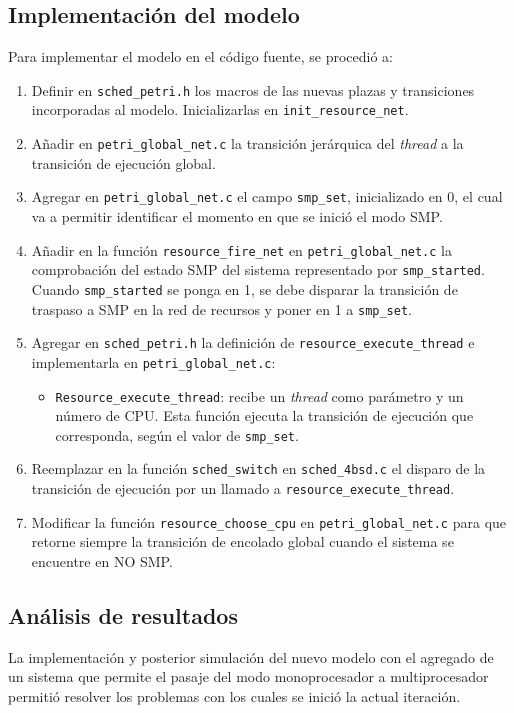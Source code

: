 \documentclass[a4paper]{book}
\begin{document}
\subsection{Implementaci\'on del modelo}
Para implementar el modelo en el c\'odigo fuente, se procedi\'o a:
\begin{enumerate}
\item Definir en \verb|sched_petri.h| los macros de las nuevas plazas y transiciones incorporadas al modelo. Inicializarlas en \verb|init_resource_net|.
\item A\~nadir en \verb|petri_global_net.c| la transici\'on jer\'arquica del \emph{thread} a la transici\'on de ejecuci\'on global.
\item Agregar en \verb|petri_global_net.c| el campo \verb|smp_set|, inicializado en 0, el cual va a permitir identificar el momento en que se inici\'o el modo SMP.
\item A\~nadir en la funci\'on \verb|resource_fire_net| en \verb|petri_global_net.c| la comprobaci\'on del estado SMP del sistema representado por \verb|smp_started|. Cuando \verb|smp_started| se ponga en 1, se debe disparar la transici\'on de traspaso a SMP en la red de recursos y poner en 1 a \verb|smp_set|.
\item Agregar en \verb|sched_petri.h| la definici\'on de  \verb|resource_execute_thread| e implementarla en \verb|petri_global_net.c|:
\begin{itemize}
\item \verb|Resource_execute_thread|: recibe un \emph{thread} como par\'ametro y un n\'umero de CPU. Esta funci\'on ejecuta la transici\'on de ejecuci\'on que corresponda, seg\'un el valor de \verb|smp_set|.
\end{itemize}
\item Reemplazar en la funci\'on \verb|sched_switch| en \verb|sched_4bsd.c| el disparo de la transici\'on de ejecuci\'on por un llamado a \verb|resource_execute_thread|.
\item Modificar la funci\'on \verb|resource_choose_cpu| en \verb|petri_global_net.c| para que retorne siempre la transici\'on de encolado global cuando el sistema se encuentre en NO SMP.
\end{enumerate}

\subsection{An\'alisis de resultados}
La implementaci\'on y posterior simulaci\'on del nuevo modelo con el agregado de un sistema que permite el pasaje del modo monoprocesador a multiprocesador permiti\'o resolver los problemas con los cuales se inici\'o la actual iteraci\'on.\\
\end{document}
